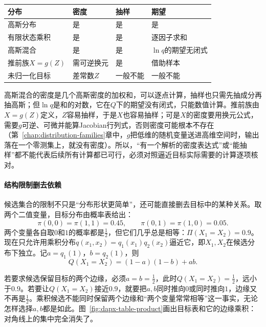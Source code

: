 \begin{BookInlineTable}
 \centering
 \caption{几类分布在三项计算上的情况。“是”指有闭式或可以直接执行的算法；求期望一栏针对后文常用的$\mathbb{E}[\ln q(X)]$与低次多项式的期望。}
 \label{tab:dapx-abilities}
 \begin{tabular}{llll}
  \toprule
  分布 & 密度 & 抽样 & 期望\\
  \midrule
  高斯分布 & 是 & 是 & 是\\
  有限状态乘积 & 是 & 是 & 逐因子求和\\
  高斯混合 & 是 & 是 & $\ln q$的期望无闭式\\
  推前族$X=g(Z)$ & 需可逆换元 & 是 & 借助样本\\
  未归一化目标 & 差常数$Z$ & 一般不能 & 一般不能\\
  \bottomrule
 \end{tabular}
\end{BookInlineTable}

高斯混合的密度是几个高斯密度的加权和，可以逐点计算，抽样也只需先抽成分再抽高斯；但$\ln q$是和的对数，它在$Q$下的期望没有闭式，只能数值计算。推前族由$X=g(Z)$定义，$Z$容易抽样，于是$X$也容易抽样；可是$X$的密度要用换元公式，需要$g$可逆、可微并能算Jacobian行列式，否则密度可能根本不存在（第~\ref{chap:distribution-families}章中，$g$把低维的随机变量送进高维空间时，输出落在一个零测集上，就没有密度）。所以，“有一个解析的密度表达式”或“能抽样”都不能代表后续所有计算都已可行，必须对照逼近目标实际需要的计算逐项核对。

\paragraph{结构限制删去依赖}
候选集合的限制不只是“分布形状更简单”，还可能直接删去目标中的某种关系。取两个二值变量，目标分布由概率表给出：
\begin{equation}
 \pi(0,0)=\pi(1,1)=0.45,\qquad \pi(0,1)=\pi(1,0)=0.05 .
 \label{eq:dapx-table}
\end{equation}
两个变量各自取$0$和$1$的概率都是$\tfrac12$，但它们几乎总是相等：$\Pi(X_1=X_2)=0.9$。现在只允许用乘积分布$q(x_1,x_2)=q_1(x_1)q_2(x_2)$逼近它，即$X_1,X_2$在候选分布下独立。记$a=q_1(1)$，$b=q_2(1)$，则
\[
 Q(X_1=X_2)=(1-a)(1-b)+ab .
\]

若要求候选保留目标的两个边缘，必须$a=b=\tfrac12$，此时$Q(X_1=X_2)=\tfrac12$，远小于$0.9$。若要让$Q(X_1=X_2)$接近$0.9$，就要把$a,b$同时推向$0$或同时推向$1$，边缘又不再是$\tfrac12$。乘积候选不能同时保留两个边缘和“两个变量常常相等”这一事实，无论怎样选择$a,b$都是如此。图~\ref{fig:dapx-table-product}画出目标表和它的边缘乘积：对角线上的集中完全消失了。

